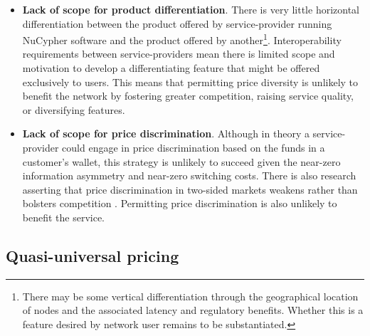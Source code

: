 \documentclass[longbibliography,nofootinbib]{revtex4-1}
\begin{document}
\begin{itemize}
    \item \textbf{Lack of scope for product differentiation}. There is very little horizontal differentiation between the product offered by service-provider running NuCypher software and the product offered by another\footnote{There may be some vertical differentiation through the geographical location of nodes and the associated latency and regulatory benefits. Whether this is a feature desired by network user remains to be substantiated.}. Interoperability requirements between service-providers mean there is limited scope and motivation to develop a differentiating feature that might be offered exclusively to users. This means that permitting price diversity is unlikely to benefit the network by fostering greater competition, raising service quality, or diversifying features. 
    \item \textbf{Lack of scope for price discrimination}. Although in theory a service-provider could engage in price discrimination based on the funds in a customer’s wallet, this strategy is unlikely to succeed given the near-zero information asymmetry and near-zero switching costs. There is also research asserting that price discrimination in two-sided markets weakens rather than bolsters competition \cite{discrim}. Permitting price discrimination is also unlikely to benefit the service.
\end{itemize}

\subsection{Quasi-universal pricing} \label{qup}
\end{document}
